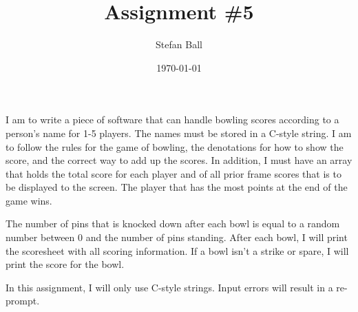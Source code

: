\documentclass{article}
\title{Assignment \#5}
\author{Stefan Ball}
\date{\today}
\begin{document}
\maketitle


I am to write a piece of software that can handle bowling scores according to a person's name for 1-5 players. The names must be stored in a C-style string. I am to follow the rules for the game of bowling, the denotations for how to show the score, and the correct way to add up the scores. In addition, I must have an array that holds the total score for each player and of all prior frame scores that is to be displayed to the screen. The player that has the most points at the end of the game wins. \newline

The number of pins that is knocked down after each bowl is equal to a random number between 0 and the number of pins standing. After each bowl, I will print the scoresheet with all scoring information. If a bowl isn't a strike or spare, I will print the score for the bowl. \newline

In this assignment, I will only use C-style strings. Input errors will result in a re-prompt.










\end{document}
